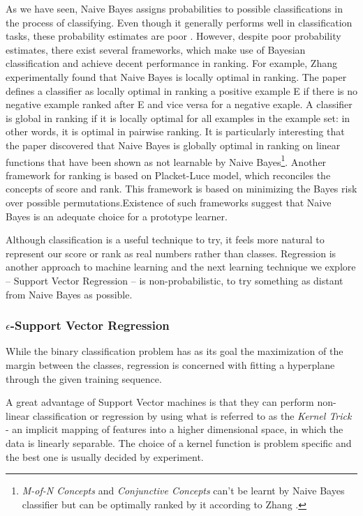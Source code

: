 \documentclass[11pt,twoside,notitlepage]{report}
\begin{document}
As we have seen, Naive Bayes assigns probabilities to possible classifications
in the process of classifying. Even though it generally performs well in
classification tasks, these probability estimates are poor \cite{domingos96}.
However, despite poor probability estimates, there exist several frameworks,
which make use of Bayesian classification and achieve decent performance in
ranking. For example, Zhang \cite{zhang04} experimentally found that Naive
Bayes is locally optimal in ranking. The paper defines a classifier as locally
optimal in ranking a positive example E if there is no negative example ranked
after E and vice versa for a negative exaple. A classifier is global in ranking
if it is locally optimal for all examples in the example set: in other words,
it is optimal in pairwise ranking.  It is particularly interesting that the
paper discovered that Naive Bayes is globally optimal in ranking on linear
functions that have been shown as not learnable by Naive
Bayes\footnote{\textit{M-of-N
  Concepts} and \textit{Conjunctive Concepts} can't be learnt by Naive Bayes classifier but
can be optimally ranked by it according to Zhang \cite{zhang04}.}.
Another framework for ranking \cite{bayesrank} is based on Placket-Luce model, which reconciles
the concepts of score and rank. This framework is based on minimizing the Bayes
risk over possible permutations.Existence of such frameworks suggest that Naive Bayes is an adequate choice
for a prototype learner.

Although classification is a useful technique to try, it feels more natural to
represent our score or rank as real numbers rather than classes. Regression is
another approach to machine learning and the next learning technique we explore
-- Support Vector Regression -- is non-probabilistic, to try something as distant
from Naive Bayes as possible.

\subsubsection*{\(\epsilon\)-Support Vector Regression}
While the binary classification problem has as its goal the maximization of the
margin between the classes, regression is concerned with fitting a hyperplane
through the given training sequence. 

A great advantage of Support Vector machines is that they can perform
non-linear classification or regression by using what is referred to as the
\textit{Kernel Trick} - an implicit mapping of features into a higher
dimensional space, in which the data is linearly separable. The choice of a
kernel function is problem specific and the best one is usually decided by
experiment. 
\end{document}
